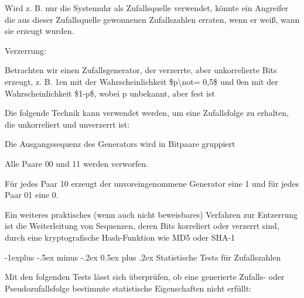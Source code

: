\documentclass[a4paper]{article}
\makeatletter
\renewcommand{\subsection}{\@startsection{subsection}{2}{0mm}%
 {-1explus -.5ex minus -.2ex}%
 {0.5ex plus .2ex}%
 {\normalfont\normalsize\bfseries}}
\makeatother
\begin{document}
\begin{multicols}{3}
\begin{itemize*}
            \begin{itemize*}
                  \item Wird z. B. nur die Systemuhr als Zufallsquelle verwendet, könnte ein Angreifer die aus dieser Zufallsquelle gewonnenen Zufallszahlen erraten, wenn er weiß, wann sie erzeugt wurden.
            \end{itemize*}
            \item
            Verzerrung:

            \begin{itemize*}
                  \item Betrachten wir einen Zufallsgenerator, der verzerrte, aber unkorrelierte Bits erzeugt, z. B. 1en mit der Wahrscheinlichkeit \$p\textbackslash not= 0,5\$ und 0en mit der Wahrscheinlichkeit \$1-p\$, wobei p unbekannt, aber fest ist
            \end{itemize*}
            \item
            Die folgende Technik kann verwendet werden, um eine Zufallsfolge zu
            erhalten, die unkorreliert und unverzerrt ist:

            \begin{itemize*}
                  \item Die Ausgangssequenz des Generators wird in Bitpaare gruppiert
                  \item Alle Paare 00 und 11 werden verworfen.
                  \item Für jedes Paar 10 erzeugt der unvoreingenommene Generator eine 1 und für jedes Paar 01 eine 0.
            \end{itemize*}
            \item
            Ein weiteres praktisches (wenn auch nicht beweisbares) Verfahren zur
            Entzerrung ist die Weiterleitung von Sequenzen, deren Bits korreliert
            oder verzerrt sind, durch eine kryptografische Hash-Funktion wie MD5
            oder SHA-1
      \end{itemize*}


      \subsection{Statistische Tests für
            Zufallszahlen}

      \begin{itemize*}
            \item
            Mit den folgenden Tests lässt sich überprüfen, ob eine generierte
            Zufalls- oder Pseudozufallsfolge bestimmte statistische Eigenschaften
            nicht erfüllt:


\end{itemize*}
\end{multicols}
\end{document}
